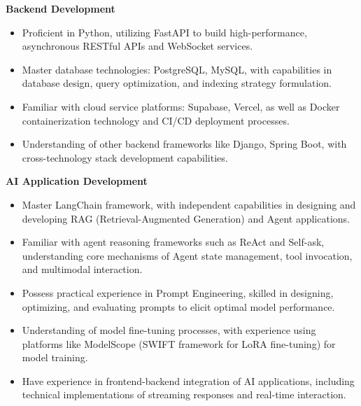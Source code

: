 \documentclass{resume}
\begin{document}
\textbf{Backend Development}
    \begin{itemize}
        \item Proficient in Python, utilizing FastAPI to build high-performance, asynchronous RESTful APIs and WebSocket services.
        \item Master database technologies: PostgreSQL, MySQL, with capabilities in database design, query optimization, and indexing strategy formulation.
        \item Familiar with cloud service platforms: Supabase, Vercel, as well as Docker containerization technology and CI/CD deployment processes.
        \item Understanding of other backend frameworks like Django, Spring Boot, with cross-technology stack development capabilities.
    \end{itemize}

\textbf{AI Application Development}
    \begin{itemize}
        \item Master LangChain framework, with independent capabilities in designing and developing RAG (Retrieval-Augmented Generation) and Agent applications.
        \item Familiar with agent reasoning frameworks such as ReAct and Self-ask, understanding core mechanisms of Agent state management, tool invocation, and multimodal interaction.
        \item Possess practical experience in Prompt Engineering, skilled in designing, optimizing, and evaluating prompts to elicit optimal model performance.
        \item Understanding of model fine-tuning processes, with experience using platforms like ModelScope (SWIFT framework for LoRA fine-tuning) for model training.
        \item Have experience in frontend-backend integration of AI applications, including technical implementations of streaming responses and real-time interaction.
    \end{itemize}
\end{document}
